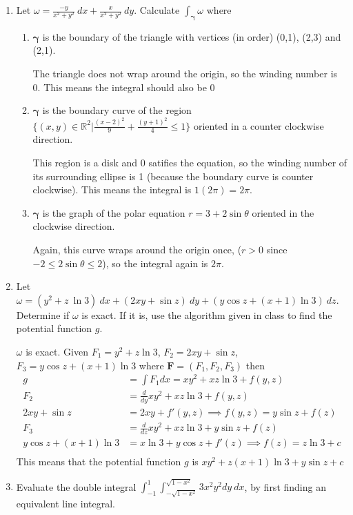 \documentclass{article}
\newcommand{\deriv}[1]{\frac{d}{d #1}}
\newcommand{\gam}{\boldsymbol{\gamma}}
\begin{document}
\thispagestyle{fancy}

\begin{enumerate}
    \item Let $\displaystyle \omega = \frac{-y}{x^2+y^2}\ dx + \frac{x}{x^2+y^2}\ dy$. Calculate $\displaystyle \int_{\gam} \omega$ where
    \begin{enumerate}
        \item $\gam$ is the boundary of the triangle with vertices (in order) (0,1), (2,3) and (2,1).

        The triangle does not wrap around the origin, so the winding number is 0. This means the integral should also be 0
        \item $\gam$ is the boundary curve of the region $\displaystyle \Bigg\{(x,y) \in \mathbb{R}^2 \Bigg|\frac{(x-2)^2}{9} + \frac{(y+1)^2}{4} \leq 1 \Bigg\}$ oriented in a counter clockwise direction.

        This region is a disk and 0 satifies the equation, so the winding number of its surrounding ellipse is 1 (because the boundary curve is counter clockwise). This means the integral is $1(2\pi) = 2\pi$.
        \item $\gam$ is the graph of the polar equation $r = 3 + 2 \sin \theta$ oriented in the clockwise direction.

        Again, this curve wraps around the origin once, ($r > 0$ since $-2 \leq 2 \sin \theta \leq 2$), so the integral again is $2\pi$.
    \end{enumerate}
    \newpage
    \item Let $\omega = (y^2 + z \ \ln 3)\ dx + (2xy + \sin z)\ dy + (y \cos z + (x + 1) \ln 3)\ dz$. Determine if $\omega$ is exact. If it is, use the algorithm given in class to find the potential function $g$.

    $\omega$ is exact. Given $F_1 = y^2 + z \ln 3$, $F_2 = 2xy + \sin z$, $F_3 = y \cos z + (x + 1) \ln 3$ where $\boldsymbol F = ( F_1,F_2, F_3 )$ then 
    \begin{align*}
        g &= \int F_1 dx = xy^2 + xz \ln 3 + f(y,z) \\
        F_2 &= \deriv{y} xy^2 + xz \ln 3 + f(y,z) \\
        2xy + \sin z &=  2xy + f'(y,z) \implies f(y,z) = y \sin z + f(z) \\
        F_3 &= \deriv{z} xy^2 + xz \ln 3 + y \sin z + f(z)\\
        y \cos z + (x + 1) \ln 3 &= x \ln 3 + y \cos z + f'(z) \implies f(z) = z \ln 3 + c \\
    \end{align*}
    This means that the potential function $g$ is $xy^2 + z(x+1)\ln 3+ y \sin z + c$
    \newpage
    \item Evaluate the double integral $\displaystyle \int_{-1}^{1} \int_{-\sqrt{1-x^2}}^{\sqrt{1-x^2}}3x^2y^2dy\ dx$, by first finding an equivalent line integral.


\end{enumerate}
\end{document}
